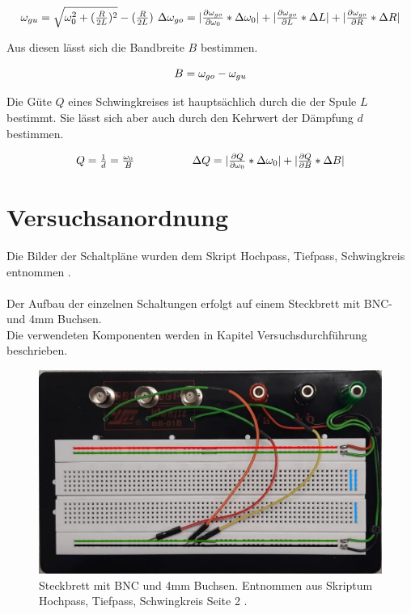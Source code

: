 \documentclass[12pt,a4paper,twoside]{article}
\begin{document}
\begin{equation}
    \label{eq:wgu}
    \centerline{$\omega_{gu} = \sqrt{\omega_0^2 + (\frac{R}{2L})^2} - (\frac{R}{2L})$ \\ $\Delta \omega_{go}= \vert \frac{\partial \omega_{go}}{\partial \omega_0} * \Delta \omega_0 \vert + \vert \frac{\partial \omega_{go}}{\partial L} * \Delta L \vert + \vert \frac{\partial \omega_{go}}{\partial R} * \Delta R \vert$}
\end{equation}

\noindent
Aus diesen lässt sich die Bandbreite $B$ bestimmen. 

\begin{equation}
    \label{eq:Bandbreite}
    \centerline{$B = \omega_{go} - \omega_{gu}$}
\end{equation}

\noindent
Die Güte $Q$ eines Schwingkreises ist hauptsächlich durch die der Spule $L$ bestimmt. Sie lässt sich aber auch durch den Kehrwert der Dämpfung $d$ bestimmen. 

\begin{equation}
    \label{eq:Güte}
    \centerline{$Q = \frac{1}{d} = \frac{\omega_0}{B}$ \\ $\Delta Q = \vert \frac{\partial Q}{\partial \omega_0} * \Delta \omega_0 \vert + \vert \frac{\partial Q}{\partial B} * \Delta B \vert$}
\end{equation}


\section{Versuchsanordnung} %
Die Bilder der Schaltpläne wurden dem Skript Hochpass, Tiefpass, Schwingkreis entnommen \cite{teachcenter2}. 
\\
\\
Der Aufbau der einzelnen Schaltungen erfolgt auf einem Steckbrett mit BNC- und 4mm Buchsen. 
\\
Die verwendeten Komponenten werden in Kapitel Versuchsdurchführung beschrieben. 

\begin{figure}[H]
    \centering
    \includegraphics[width=0.6\linewidth]{nudes/steckbrett.jpg}
    \caption{Steckbrett mit BNC und 4mm Buchsen. Entnommen aus Skriptum Hochpass, Tiefpass, Schwingkreis Seite 2 \cite{teachcenter2}.}
    \label{fig:steckbrett} 
\end{figure}
\end{document}

